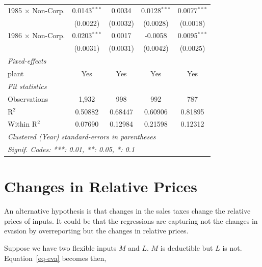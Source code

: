 \documentclass[
  12pt]{article}
\theoremstyle{definition}
\theoremstyle{remark}
\begin{document}
\begin{table}
\begin{minipage}{\linewidth}
\begin{tabular}{lcccc}
   1985 $\times$ Non-Corp.  & 0.0143$^{***}$  & 0.0034          & 0.0128$^{***}$  & 0.0077$^{***}$\\   
                            & (0.0022)        & (0.0032)        & (0.0028)        & (0.0018)\\   
   1986 $\times$ Non-Corp.  & 0.0203$^{***}$  & 0.0017          & -0.0058         & 0.0095$^{***}$\\   
                            & (0.0031)        & (0.0031)        & (0.0042)        & (0.0025)\\   
   \midrule
   \emph{Fixed-effects}\\
   plant                    & Yes             & Yes             & Yes             & Yes\\  
   \midrule
   \emph{Fit statistics}\\
   Observations             & 1,932           & 998             & 992             & 787\\  
   R$^2$                    & 0.50882         & 0.68447         & 0.60906         & 0.81895\\  
   Within R$^2$             & 0.07690         & 0.12984         & 0.21598         & 0.12312\\  
   \midrule \midrule
   \multicolumn{5}{l}{\emph{Clustered (Year) standard-errors in parentheses}}\\
   \multicolumn{5}{l}{\emph{Signif. Codes: ***: 0.01, **: 0.05, *: 0.1}}\\
\end{tabular}
\par\endgroup

\end{minipage}%

\end{table}%

\section{Changes in Relative Prices}\label{changes-in-relative-prices}

An alternative hypothesis is that changes in the sales taxes change the
relative prices of inputs. It could be that the regressions are
capturing not the changes in evasion by overreporting but the changes in
relative prices.

Suppose we have two flexible inputs \(M\) and \(L\). \(M\) is deductible
but \(L\) is not. Equation~\ref{eq-eva} becomes then,
\end{document}
